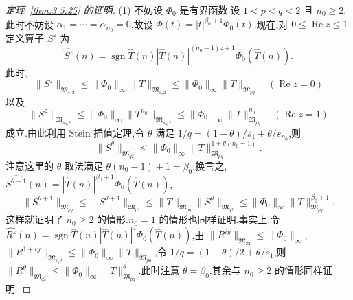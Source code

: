 \begin{proof}[定理~\ref{thm:3.5.25} 的证明]
(1) 不妨设 $\Phi_0$ 是有界函数.设 $1 < p < q < 2$ 且 $n_0 \geq 2$.此时不妨设 $\alpha_1 = \cdots = \alpha_{n_0} = 0$,故设 $\Phi(t) = |t|^{\beta_0 + 1}\Phi_0(t)$.现在,对 $0 \leq \operatorname{Re} z \leq 1$ 定义算子 $S^z$ 为
\begin{equation*}
\widehat{S^z}(n) = \operatorname{sgn}\widehat{T}(n)\left|\widehat{T}(n)\right|^{(n_0-1)z+1}\Phi_{0}(\widehat{T}(n)).
\end{equation*}
此时,
\begin{equation*}
\|S^{z}\|_{\mathfrak{M}_{s_{1}2}} \leq \|\Phi_{0}\|_{\infty}\|T\|_{\mathfrak{M}_{s_{1}2}} \leq \|\Phi_{0}\|_{\infty}\|T\|_{\mathfrak{M}_{pq}} \quad (\operatorname{Re}z = 0)
\end{equation*}
以及
\begin{equation*}
\|S^{z}\|_{\mathfrak{M}_{s_{n_0}2}} \leq \|\Phi_{0}\|_{\infty}\|T^{n_{0}}\|_{\mathfrak{M}_{s_{n_0}2}} \leq \|\Phi_{0}\|_{\infty}\|T\|_{\mathfrak{M}_{pq}}^{n_{0}} \quad (\operatorname{Re}z = 1)
\end{equation*}
成立.由此利用 Stein 插值定理,令 $\theta$ 满足 $1/q = (1-\theta)/s_{1} + \theta/s_{n_{0}}$,则
\begin{equation*}
\|S^{\theta}\|_{\mathfrak{M}_{q2}} \leq \|\Phi_{0}\|_{\infty}\|T\|_{\mathfrak{M}_{pq}}^{1+\theta(n_0-1)}.
\end{equation*}
注意这里的 $\theta$ 取法满足 $\theta(n_{0}-1)+1=\beta_{0}$.换言之,$\widehat{S^{\theta+1}}(n)=\left|\widehat{T}(n)\right|^{\beta_{0}+1}\Phi_{0}(\widehat{T}(n))$,
\begin{equation*}
\|S^{\theta+1}\|_{\mathfrak{M}_{pq}} \leq \|S^{\theta+1}\|_{\mathfrak{M}_{p2}} \leq \|T\|_{\mathfrak{M}_{pq}}\|S^{\theta}\|_{\mathfrak{M}_{q2}} \leq \|\Phi_{0}\|_{\infty}\|T\|_{\mathfrak{M}_{pq}}^{\beta_{0}+1}.
\end{equation*}
这样就证明了 $n_{0} \geq 2$ 的情形.$n_{0} = 1$ 的情形也同样证明.事实上,令 $\widehat{R^{z}}(n) = \operatorname{sgn}\widehat{T}(n)|\widehat{T}(n)|^{z}\Phi_{0}(\widehat{T}(n))$,由 $\|R^{iy}\|_{\mathfrak{M}_{22}} \leq \|\Phi_{0}\|_{\infty}$,$\|R^{1+iy}\|_{\mathfrak{M}_{s_{1}2}} \leq \|\Phi_{0}\|_{\infty}\|T\|_{\mathfrak{M}_{pq}}$,令 $1/q = (1-\theta)/2 + \theta/s_{1}$,则 $\|R^{\theta}\|_{\mathfrak{M}_{q2}} \leq \|\Phi_{0}\|_{\infty}\|T\|_{\mathfrak{M}_{pq}}^{\theta}$.此时注意 $\theta = \beta_{0}$.其余与 $n_{0} \geq 2$ 的情形同样证明.


\end{proof}
